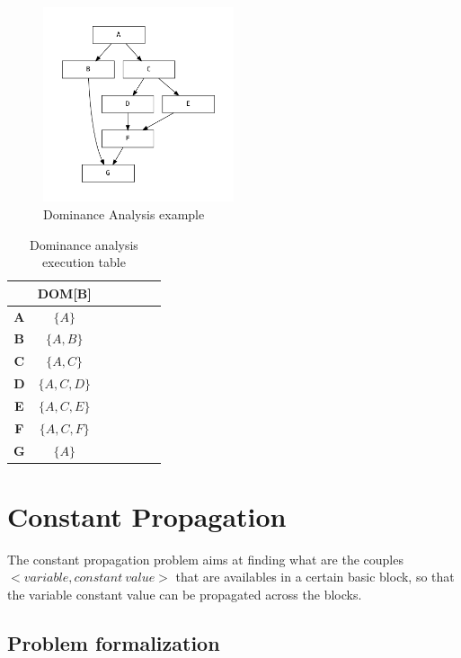 \documentclass{article}
\begin{document}
\begin{figure}[H]
	\centering
	\includegraphics[width=0.5\textwidth]{graphs/dominance.pdf}
	\caption{Dominance Analysis example}
	\label{fig:enter-label}
\end{figure}

\begin{table}[H]
	\centering
	\begin{tabular}{|c|c|c|c|c|c|c|}
		\hline
		           & \textbf{DOM[B]} \\ \hline
		\textbf{A} & $\{A\}$         \\ \hline
		\textbf{B} & $\{A, B\}$      \\ \hline
		\textbf{C} & $\{A, C\}$      \\ \hline
		\textbf{D} & $\{A, C, D\}$   \\ \hline
		\textbf{E} & $\{A, C, E\}$   \\ \hline
		\textbf{F} & $\{A, C, F\}$   \\ \hline
		\textbf{G} & $\{A\}$         \\ \hline
	\end{tabular}
	\caption{Dominance analysis execution table}
\end{table}

\section{Constant Propagation}

The constant propagation problem aims at finding what are the couples $<variable, constant \ value>$ that are availables in a certain basic block, so that the variable constant value can be propagated across the blocks.

\subsection{Problem formalization}
\end{document}
